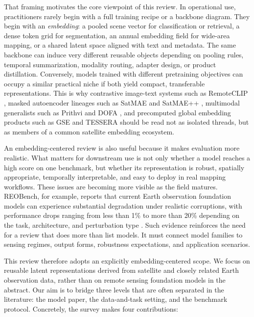 That framing motivates the core viewpoint of this review. In operational use, practitioners rarely begin with a full training recipe or a backbone diagram. They begin with an \emph{embedding}: a pooled scene vector for classification or retrieval, a dense token grid for segmentation, an annual embedding field for wide-area mapping, or a shared latent space aligned with text and metadata. The same backbone can induce very different reusable objects depending on pooling rules, temporal summarization, modality routing, adapter design, or product distillation. Conversely, models trained with different pretraining objectives can occupy a similar practical niche if both yield compact, transferable representations. This is why contrastive image-text systems such as RemoteCLIP \citep{remoteclip}, masked autoencoder lineages such as SatMAE and SatMAE++ \citep{satmae,satmaepp}, multimodal generalists such as Prithvi and DOFA \citep{prithvi,dofa}, and precomputed global embedding products such as GSE and TESSERA \citep{gse,tessera} should be read not as isolated threads, but as members of a common satellite embedding ecosystem.

An embedding-centered review is also useful because it makes evaluation more realistic. What matters for downstream use is not only whether a model reaches a high score on one benchmark, but whether its representation is robust, spatially appropriate, temporally interpretable, and easy to deploy in real mapping workflows. These issues are becoming more visible as the field matures. REOBench, for example, reports that current Earth observation foundation models can experience substantial degradation under realistic corruptions, with performance drops ranging from less than 1\% to more than 20\% depending on the task, architecture, and perturbation type \citep{reobench}. Such evidence reinforces the need for a review that does more than list models. It must connect model families to sensing regimes, output forms, robustness expectations, and application scenarios.

This review therefore adopts an explicitly embedding-centered scope. We focus on reusable latent representations derived from satellite and closely related Earth observation data, rather than on remote sensing foundation models in the abstract. Our aim is to bridge three levels that are often separated in the literature: the model paper, the data-and-task setting, and the benchmark protocol. Concretely, the survey makes four contributions:

